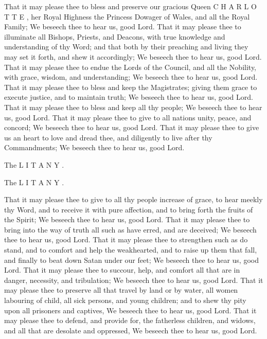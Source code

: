 That it may please thee to bless and preserve our gracious Queen C H A R L O T T E , her Royal Highness the Princess Dowager of Wales, and all the Royal Family; We beseech thee to hear us, good Lord. That it may please thee to illuminate all Bishops, Priests, and Deacons, with true knowledge and understanding of thy Word; and that both by their preaching and living they may set it forth, and shew it accordingly; We beseech thee to hear us, good Lord. That it may please thee to endue the Lords of the Council, and all the Nobility, with grace, wisdom, and understanding; We beseech thee to hear us, good Lord. That it may please thee to bless and keep the Magistrates; giving them grace to execute justice, and to maintain truth; We beseech thee to hear us, good Lord. That it may please thee to bless and keep all thy people; We beseech thee to hear us, good Lord. That it may please thee to give to all nations unity, peace, and concord; We beseech thee to hear us, good Lord. That it may please thee to give us an heart to love and dread thee, and diligently to live after thy Commandments; We beseech thee to hear us, good Lord.

The L I T A N Y .

The L I T A N Y .

That it may please thee to give to all thy people increase of grace, to hear meekly thy Word, and to receive it with pure affection, and to bring forth the fruits of the Spirit; We beseech thee to hear us, good Lord. That it may please thee to bring into the way of truth all such as have erred, and are deceived; We beseech thee to hear us, good Lord. That it may please thee to strengthen such as do stand, and to comfort and help the weakhearted, and to raise up them that fall, and finally to beat down Satan under our feet; We beseech thee to hear us, good Lord. That it may please thee to succour, help, and comfort all that are in danger, necessity, and tribulation; We beseech thee to hear us, good Lord. That it may please thee to preserve all that travel by land or by water, all women labouring of child, all sick persons, and young children; and to shew thy pity upon all prisoners and captives, We beseech thee to hear us, good Lord. That it may please thee to defend, and provide for, the fatherless children, and widows, and all that are desolate and oppressed, We beseech thee to hear us, good Lord.

